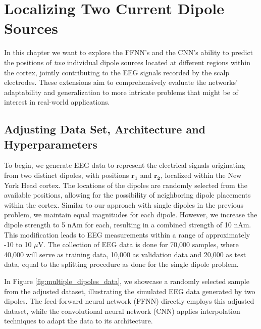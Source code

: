 \documentclass[a4paper, UKenglish, 11pt]{uiomaster}
\begin{document}
\chapter{Localizing Two Current Dipole Sources} \label{chap:two_dipole_FFNN}
In this chapter we want to explore the FFNN's and the CNN's ability to predict the positions of \emph{two} individual dipole sources located at different regions within the cortex, jointly contributing to the EEG signals recorded by the scalp electrodes. These extensions aim to comprehensively evaluate the networks' adaptability and generalization to more intricate problems that might be of interest in real-world applications.


\section{Adjusting Data Set, Architecture and Hyperparameters}
To begin, we generate EEG data to represent the electrical signals originating from two distinct dipoles, with positions $\mathbf{r_1}$ and $\mathbf{r_2}$, localized within the New York Head cortex. The locations of the dipoles are randomly selected from the available positions, allowing for the possibility of neighboring dipole placements within the cortex. Similar to our approach with single dipoles in the previous problem, we maintain equal magnitudes for each dipole. However, we increase the dipole strength to 5 nAm for each, resulting in a combined strength of 10 nAm. This modification leads to EEG measurements within a range of approximately -10 to 10 $\mu$V. The collection of EEG data is done for 70,000 samples, where 40,000 will serve as training data, 10,000 as validation data and 20,000 as test data, equal to the splitting procedure as done for the single dipole problem.

In Figure \ref{fig:multiple_dipoles_data}, we showcase a randomly selected sample from the adjusted dataset, illustrating the simulated EEG data generated by two dipoles. The feed-forward neural network (FFNN) directly employs this adjusted dataset, while the convolutional neural network (CNN) applies interpolation techniques to adapt the data to its architecture.
\end{document}
